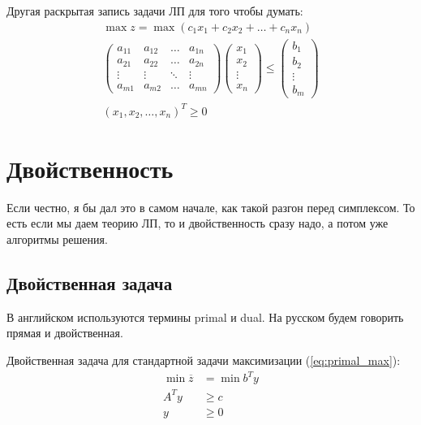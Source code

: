 \documentclass[a4paper,article,14pt]{extarticle}
\begin{document}
Другая раскрытая запись задачи ЛП для того чтобы думать:
\begin{equation}
    \begin{gathered}
        \max z = \max (c_1x_1 + c_2x_2 + \ldots + c_nx_n) \\
        \begin{pmatrix}
            a_{11} & a_{12} & \ldots & a_{1n} \\
            a_{21} & a_{22} & \ldots & a_{2n} \\
            \vdots & \vdots & \ddots & \vdots \\
            a_{m1} & a_{m2} & \ldots & a_{mn}
        \end{pmatrix}
        \begin{pmatrix}
            x_1 \\ x_2 \\ \vdots \\ x_n
        \end{pmatrix}
        \le
        \begin{pmatrix}
            b_1 \\ b_2 \\ \vdots \\ b_m
        \end{pmatrix}
        \\
        (x_1, x_2, \ldots, x_n)^T \ge 0
    \end{gathered}
\end{equation}

\section{Двойственность}

Если честно, я бы дал это в самом начале, как такой разгон перед симплексом.
То есть если мы даем теорию ЛП, то и двойственность сразу надо, а потом уже алгоритмы решения.

\subsection{Двойственная задача}

В английском используются термины primal и dual.
На русском будем говорить прямая и двойственная.

Двойственная задача для стандартной задачи максимизации (\ref{eq:primal_max}):
\begin{equation} \label{dual_max}
    \begin{aligned}
        \min \overline z & = \min b^Ty \\
        A^Ty & \ge c \\
        y & \ge 0
    \end{aligned}
\end{equation}
\end{document}
